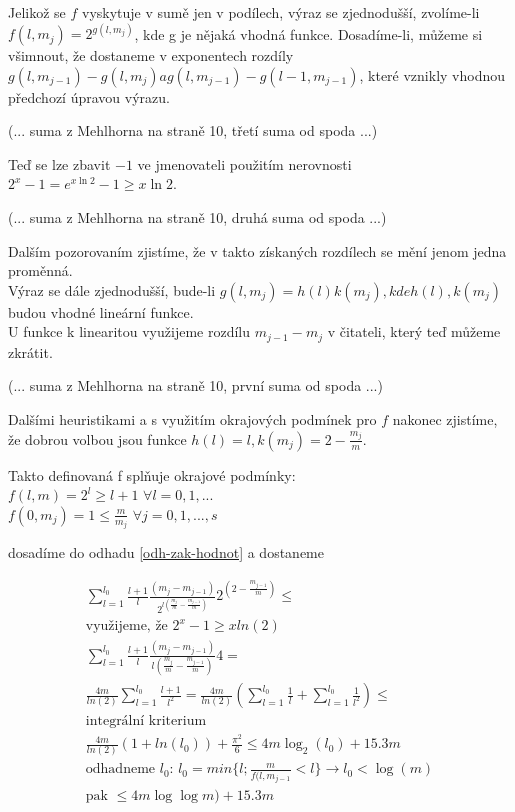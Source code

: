 \begin{pozn}
Jelikož se $f$ vyskytuje v sumě jen v podílech, výraz se zjednodušší,
zvolíme-li $f(l, m_j) = 2^{g(l, m_j)}$, kde g je nějaká vhodná funkce.
Dosadíme-li, můžeme si všimnout, že dostaneme v exponentech rozdíly 
$g(l, m_{j-1}) - g(l, m_j) a g(l, m_{j-1}) - g(l - 1, m_{j-1})$,
které vznikly vhodnou předchozí úpravou výrazu.

(... suma z Mehlhorna na straně 10, třetí suma od spoda ...)
\par

Teď se lze zbavit $-1$ ve jmenovateli použitím nerovnosti 
$2^x - 1 = e^{x\ln2} - 1 \geq x\ln2$.

(... suma z Mehlhorna na straně 10, druhá suma od spoda ...)
\par
Dalším pozorovaním zjistíme, že v takto získaných rozdílech se mění
jenom jedna proměnná. \\
Výraz se dále zjednodušší, bude-li $g(l, m_j) = h(l)k(m_j), kde h(l), k(m_j)$
budou vhodné lineární funkce. \\
U funkce k linearitou využijeme rozdílu $m_{j-1} - m_j$ v čitateli, který
teď můžeme zkrátit.

(... suma z Mehlhorna na straně 10, první suma od spoda ...)
\par
Dalšími heuristikami a s využitím okrajových podmínek pro $f$ nakonec
zjistíme, že dobrou volbou jsou funkce $h(l) = l, k(m_j) = 2 - \frac {m_j}m.$
\end{pozn}
 
Takto definovaná f splňuje okrajové podmínky: \\
$f(l,m) = 2^l \geq l+1$ $\forall l=0,1,...$ \\
$f(0,m_j) = 1 \leq \frac{m}{m_j}$ $\forall j=0,1,...,s$

dosadíme do odhadu \ref{odh-zak-hodnot} a dostaneme 

\begin{multline}
\sum_{l=1}^{l_0} 
  \frac{l+1}{l} 
  \frac
    {(m_j - m_{j-1})}
    { 2^{l ( \frac{m_j}{m} - \frac{m_{j-1}}{m} ) }}
  2^{( 2 - \frac{m_{j-1}}{m} )} \leq \\
\text{využijeme, že $2^x - 1 \geq x ln(2)$} \\
\sum_{l=1}^{l_0} 
  \frac{l+1}{l} 
  \frac{(m_j - m_{j-1})}{l( \frac{m_j}{m} - \frac{m_{j-1}}{m} )} 4 = \\
\frac{4m}{ln(2)} \sum_{l=1}^{l_0} 
  \frac{l+1}{l^2} = \frac{4m}{ln(2)} (\sum_{l=1}^{l_0} \frac{1}{l} +
  \sum_{l=1}^{l_0} \frac{1}{l^2}) \leq \\
\text{integrální kriterium} \\
\frac{4m}{ln(2)} (1 + ln(l_0)) + \frac{\pi^2}{6} \leq 4m \log_2(l_0) +
15.3m \\
\text{odhadneme $l_0$: } 
l_0 = min\{l; \frac{m}{f(l,m_{j-1}} < l\} \rightarrow l_0 < \log(m) \\
\text{pak } \leq 4m\log \log m) + 15.3m
\end{multline}

